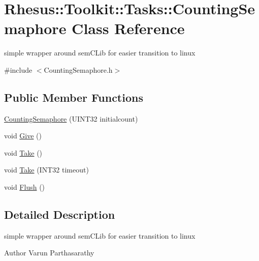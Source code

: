 \hypertarget{class_rhesus_1_1_toolkit_1_1_tasks_1_1_counting_semaphore}{\section{Rhesus\-:\-:Toolkit\-:\-:Tasks\-:\-:Counting\-Semaphore Class Reference}
\label{class_rhesus_1_1_toolkit_1_1_tasks_1_1_counting_semaphore}
}


simple wrapper around sem\-C\-Lib for easier transition to linux  




{\ttfamily \#include $<$Counting\-Semaphore.\-h$>$}

\subsection*{Public Member Functions}
\begin{DoxyCompactItemize}
\item 
\hyperlink{class_rhesus_1_1_toolkit_1_1_tasks_1_1_counting_semaphore_ae249f411092cd86136d4dc5192a3f67f}{Counting\-Semaphore} (U\-I\-N\-T32 initialcount)
\item 
void \hyperlink{class_rhesus_1_1_toolkit_1_1_tasks_1_1_counting_semaphore_a973554dba33222f0ff7f287928191267}{Give} ()
\item 
void \hyperlink{class_rhesus_1_1_toolkit_1_1_tasks_1_1_counting_semaphore_a2bc3fe4d8153cd979558ee09b66ca73e}{Take} ()
\item 
void \hyperlink{class_rhesus_1_1_toolkit_1_1_tasks_1_1_counting_semaphore_a9b54bea70b5decdcf7131375906f0a25}{Take} (I\-N\-T32 timeout)
\item 
void \hyperlink{class_rhesus_1_1_toolkit_1_1_tasks_1_1_counting_semaphore_a3b2d7faf8d16e75dfd343ec682de03b4}{Flush} ()
\end{DoxyCompactItemize}


\subsection{Detailed Description}
simple wrapper around sem\-C\-Lib for easier transition to linux 

\begin{DoxyAuthor}{Author}
Varun Parthasarathy 
\end{DoxyAuthor}


